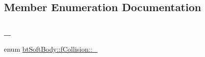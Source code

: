 \subsection{Member Enumeration Documentation}
\mbox{\label{structbtSoftBody_1_1fCollision_afeb40bef0380b8db7e9e5628cc5f08d5}} 
\subsubsection{\texorpdfstring{\+\_\+}{\_}}
{\footnotesize\ttfamily enum \hyperlink{structbtSoftBody_1_1fCollision_afeb40bef0380b8db7e9e5628cc5f08d5}{bt\+Soft\+Body\+::f\+Collision\+::\+\_\+}}

